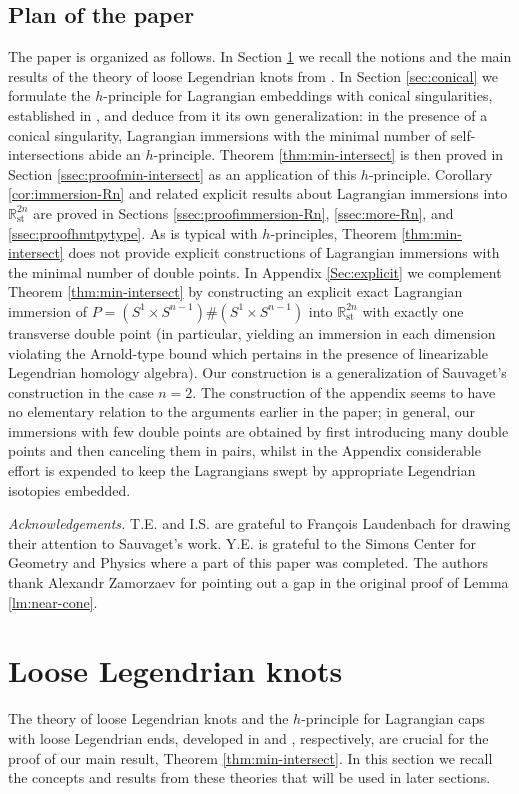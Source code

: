\documentclass[reqno,11pt]{amsart}
\numberwithin{equation}{section}
\theoremstyle{my}
\theoremstyle{my}
\theoremstyle{your}
\newcommand{\Acknowledgements}{{\em Acknowledgements.} }
\newcommand{\R}{\mathbb{R}}
\newcommand{\st}{\mathrm{st}}
\begin{document}
 \subsection*{Plan of the paper}
The paper is organized as follows. In Section \ref{sec:loose-knots} we recall the notions and the main results of the theory of loose Legendrian knots from \cite{Mur}. In Section \ref{sec:conical} we formulate the $h$-principle for Lagrangian embeddings with conical singularities, established in \cite{EliMur}, and deduce from it its own generalization: in the presence of a conical singularity, Lagrangian immersions with the minimal number of self-intersections abide an $h$-principle. Theorem \ref{thm:min-intersect} is then proved in Section \ref{ssec:proofmin-intersect} as an application of this $h$-principle. Corollary \ref{cor:immersion-Rn} and related explicit results about Lagrangian immersions into $\R^{2n}_{\st}$ are proved in Sections \ref{ssec:proofimmersion-Rn}, \ref{ssec:more-Rn}, and \ref{ssec:proofhmtpytype}.   
As is typical with $h$-principles, Theorem \ref{thm:min-intersect} does not provide explicit constructions of Lagrangian immersions with the minimal number of double points. In Appendix \ref{Sec:explicit} we complement Theorem \ref{thm:min-intersect} by constructing an explicit exact Lagrangian immersion of $P=(S^{1}\times S^{n-1})\#(S^{1}\times S^{n-1})$ into $\R^{2n}_{\st}$ with exactly one transverse double point (in particular, yielding an immersion in each dimension violating the Arnold-type bound which pertains in the presence of linearizable Legendrian homology algebra). Our construction is a generalization of Sauvaget's construction in the case $n=2$.  The construction of the appendix seems to have  no elementary relation to the arguments earlier in the paper;  in general, our immersions with few double points are obtained by first introducing many double points and then canceling them in pairs, whilst in the Appendix considerable effort is expended to keep the Lagrangians swept by appropriate Legendrian isotopies embedded.

\Acknowledgements  T.E. and I.S. are grateful to Fran\c{c}ois Laudenbach for drawing their attention to Sauvaget's work.  Y.E. is grateful to the Simons Center for Geometry and Physics where a part of this paper was completed. The authors thank Alexandr Zamorzaev for pointing out a gap in the original proof of Lemma \ref{lm:near-cone}.

\section{Loose Legendrian  knots}\label{sec:loose-knots}
The theory of loose Legendrian knots and the $h$-principle for Lagrangian caps with loose Legendrian ends, developed in \cite{Mur} and \cite{EliMur}, respectively, are crucial for the proof of our main result, Theorem \ref{thm:min-intersect}. In this section we recall the concepts and results from these theories that will be used in later sections.   
\end{document}
